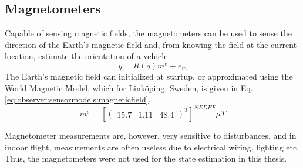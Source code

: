     \subsection{Magnetometers}
        Capable of sensing magnetic fields, the magnetometers can be used to
        sense the direction of the Earth's magnetic field and, from knowing
        the field at the current location, estimate the orientation of a vehicle.
        \begin{equation}
            y = R(q) m^{e} + e_{m}
        \end{equation}
        The Earth's magnetic field can initialized at startup, or approximated using the World Magnetic Model\cite{wmm2010},
        which for Linköping, Sweden, is given in Eq. \eqref{eq:observer:sensormodels:magneticfield}.
        \begin{equation}
            \label{eq:observer:sensormodels:magneticfield}
            m^{e} = \left[\left(\begin{array}{ccc}
                15.7 & 1.11 & 48.4
            \end{array}\right)^{T}\right]^{NEDEF} \mu T
        \end{equation}

        Magnetometer measurements are, however, very sensitive to disturbances, and in indoor
        flight, measurements are often useless due to electrical wiring, lighting etc.
        Thus, the magnetometers were not used for the state estimation in this thesis.

